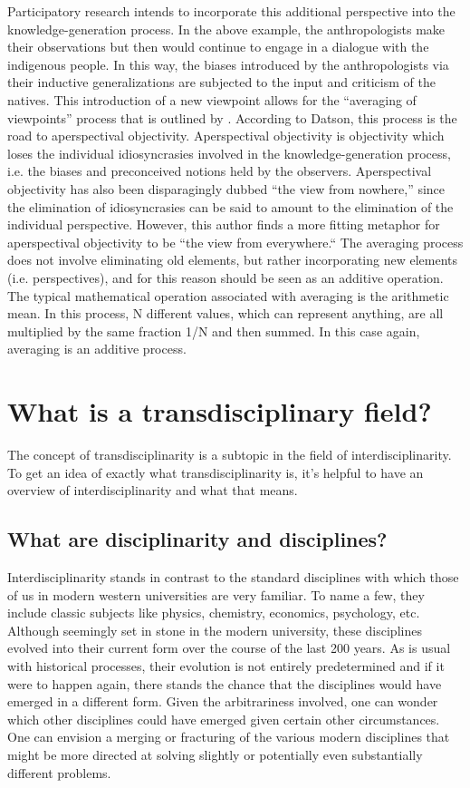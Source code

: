 \documentclass[a4paper]{article}
\begin{document}
Participatory research intends to incorporate this additional perspective into
the knowledge-generation process. In the above example, the anthropologists
make their observations but then would continue to engage in a dialogue with
the indigenous people. In this way, the biases introduced by the
anthropologists via their inductive generalizations are subjected to the input
and criticism of the natives. This introduction of a new viewpoint allows for
the ``averaging of viewpoints'' process that is outlined by
\cite{datson1992objectivity}. According to Datson, this process is the road to
aperspectival objectivity.  Aperspectival objectivity is objectivity which
loses the individual idiosyncrasies involved in the knowledge-generation
process, i.e. the biases and preconceived notions held by the observers.
Aperspectival objectivity has also been disparagingly dubbed ``the view from
nowhere,'' since the elimination of idiosyncrasies can be said to amount to the
elimination of the individual perspective. However, this author finds a more
fitting metaphor for aperspectival objectivity to be ``the view from
everywhere.`` The averaging process does not involve eliminating old elements,
but rather incorporating new elements (i.e.  perspectives), and for this reason
should be seen as an additive operation.  The typical mathematical operation
associated with averaging is the arithmetic mean. In this process, N different
values, which can represent anything, are all multiplied by the same fraction
1/N and then summed. In this case again, averaging is an additive process.


\section{What is a transdisciplinary field?}

The concept of transdisciplinarity is a subtopic in the field of
interdisciplinarity. To get an idea of exactly what transdisciplinarity is,
it’s helpful to have an overview of interdisciplinarity and what that means.

\subsection{What are disciplinarity and disciplines?}

Interdisciplinarity stands in contrast to the standard disciplines with which
those of us in modern western universities are very familiar. To name a few,
they include classic subjects like physics, chemistry, economics, psychology,
etc. Although seemingly set in stone in the modern university, these
disciplines evolved into their current form over the course of the last 200
years. As is usual with historical processes, their evolution is not entirely
predetermined and if it were to happen again, there stands the chance that the
disciplines would have emerged in a different form. Given the arbitrariness
involved, one can wonder which other disciplines could have emerged given
certain other circumstances. One can envision a merging or fracturing of the
various modern disciplines that might be more directed at solving slightly or
potentially even substantially different problems. 
\end{document}
